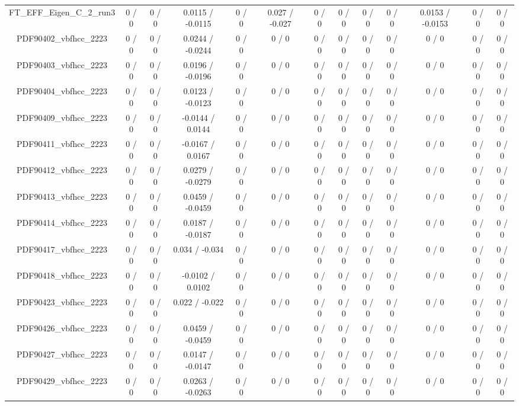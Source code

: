 \documentclass[10pt]{article}
\begin{document}
\begin{table}[htbp]
\begin{center}
\begin{tabular}{|c|c|c|c|c|c|c|c|c|c|c|c|c|}
  FT_EFF_Eigen_C_2_run3 & 0 / 0 & 0 / 0 & 0.0115 / -0.0115 & 0 / 0 & 0.027 / -0.027 & 0 / 0 & 0 / 0 & 0 / 0 & 0 / 0 & 0.0153 / -0.0153 & 0 / 0 & 0 / 0 \\ 
  PDF90402_vbfhcc_2223 & 0 / 0 & 0 / 0 & 0.0244 / -0.0244 & 0 / 0 & 0 / 0 & 0 / 0 & 0 / 0 & 0 / 0 & 0 / 0 & 0 / 0 & 0 / 0 & 0 / 0 \\ 
  PDF90403_vbfhcc_2223 & 0 / 0 & 0 / 0 & 0.0196 / -0.0196 & 0 / 0 & 0 / 0 & 0 / 0 & 0 / 0 & 0 / 0 & 0 / 0 & 0 / 0 & 0 / 0 & 0 / 0 \\ 
  PDF90404_vbfhcc_2223 & 0 / 0 & 0 / 0 & 0.0123 / -0.0123 & 0 / 0 & 0 / 0 & 0 / 0 & 0 / 0 & 0 / 0 & 0 / 0 & 0 / 0 & 0 / 0 & 0 / 0 \\ 
  PDF90409_vbfhcc_2223 & 0 / 0 & 0 / 0 & -0.0144 / 0.0144 & 0 / 0 & 0 / 0 & 0 / 0 & 0 / 0 & 0 / 0 & 0 / 0 & 0 / 0 & 0 / 0 & 0 / 0 \\ 
  PDF90411_vbfhcc_2223 & 0 / 0 & 0 / 0 & -0.0167 / 0.0167 & 0 / 0 & 0 / 0 & 0 / 0 & 0 / 0 & 0 / 0 & 0 / 0 & 0 / 0 & 0 / 0 & 0 / 0 \\ 
  PDF90412_vbfhcc_2223 & 0 / 0 & 0 / 0 & 0.0279 / -0.0279 & 0 / 0 & 0 / 0 & 0 / 0 & 0 / 0 & 0 / 0 & 0 / 0 & 0 / 0 & 0 / 0 & 0 / 0 \\ 
  PDF90413_vbfhcc_2223 & 0 / 0 & 0 / 0 & 0.0459 / -0.0459 & 0 / 0 & 0 / 0 & 0 / 0 & 0 / 0 & 0 / 0 & 0 / 0 & 0 / 0 & 0 / 0 & 0 / 0 \\ 
  PDF90414_vbfhcc_2223 & 0 / 0 & 0 / 0 & 0.0187 / -0.0187 & 0 / 0 & 0 / 0 & 0 / 0 & 0 / 0 & 0 / 0 & 0 / 0 & 0 / 0 & 0 / 0 & 0 / 0 \\ 
  PDF90417_vbfhcc_2223 & 0 / 0 & 0 / 0 & 0.034 / -0.034 & 0 / 0 & 0 / 0 & 0 / 0 & 0 / 0 & 0 / 0 & 0 / 0 & 0 / 0 & 0 / 0 & 0 / 0 \\ 
  PDF90418_vbfhcc_2223 & 0 / 0 & 0 / 0 & -0.0102 / 0.0102 & 0 / 0 & 0 / 0 & 0 / 0 & 0 / 0 & 0 / 0 & 0 / 0 & 0 / 0 & 0 / 0 & 0 / 0 \\ 
  PDF90423_vbfhcc_2223 & 0 / 0 & 0 / 0 & 0.022 / -0.022 & 0 / 0 & 0 / 0 & 0 / 0 & 0 / 0 & 0 / 0 & 0 / 0 & 0 / 0 & 0 / 0 & 0 / 0 \\ 
  PDF90426_vbfhcc_2223 & 0 / 0 & 0 / 0 & 0.0459 / -0.0459 & 0 / 0 & 0 / 0 & 0 / 0 & 0 / 0 & 0 / 0 & 0 / 0 & 0 / 0 & 0 / 0 & 0 / 0 \\ 
  PDF90427_vbfhcc_2223 & 0 / 0 & 0 / 0 & 0.0147 / -0.0147 & 0 / 0 & 0 / 0 & 0 / 0 & 0 / 0 & 0 / 0 & 0 / 0 & 0 / 0 & 0 / 0 & 0 / 0 \\ 
  PDF90429_vbfhcc_2223 & 0 / 0 & 0 / 0 & 0.0263 / -0.0263 & 0 / 0 & 0 / 0 & 0 / 0 & 0 / 0 & 0 / 0 & 0 / 0 & 0 / 0 & 0 / 0 & 0 / 0 \\ 

\end{tabular}
\end{center}
\end{table}
\end{document}
